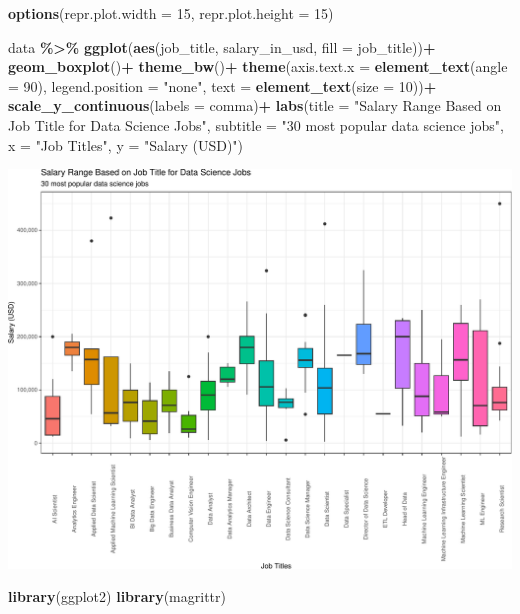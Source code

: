 \documentclass[
]{article}
\newenvironment{Shaded}{\begin{snugshade}}{\end{snugshade}}
\newcommand{\AttributeTok}[1]{\textcolor[rgb]{0.13,0.29,0.53}{#1}}
\newcommand{\DecValTok}[1]{\textcolor[rgb]{0.00,0.00,0.81}{#1}}
\newcommand{\FunctionTok}[1]{\textcolor[rgb]{0.13,0.29,0.53}{\textbf{#1}}}
\newcommand{\NormalTok}[1]{#1}
\newcommand{\SpecialCharTok}[1]{\textcolor[rgb]{0.81,0.36,0.00}{\textbf{#1}}}
\newcommand{\StringTok}[1]{\textcolor[rgb]{0.31,0.60,0.02}{#1}}
\begin{document}
\begin{Shaded}
\begin{Highlighting}[]
\FunctionTok{options}\NormalTok{(}\AttributeTok{repr.plot.width =} \DecValTok{15}\NormalTok{, }\AttributeTok{repr.plot.height =} \DecValTok{15}\NormalTok{)}

\NormalTok{data }\SpecialCharTok{\%\textgreater{}\%}
     \FunctionTok{ggplot}\NormalTok{(}\FunctionTok{aes}\NormalTok{(job\_title, salary\_in\_usd, }\AttributeTok{fill =}\NormalTok{ job\_title))}\SpecialCharTok{+}
     \FunctionTok{geom\_boxplot}\NormalTok{()}\SpecialCharTok{+}
     \FunctionTok{theme\_bw}\NormalTok{()}\SpecialCharTok{+}
     \FunctionTok{theme}\NormalTok{(}\AttributeTok{axis.text.x =} \FunctionTok{element\_text}\NormalTok{(}\AttributeTok{angle =} \DecValTok{90}\NormalTok{), }\AttributeTok{legend.position =} \StringTok{"none"}\NormalTok{, }\AttributeTok{text =} \FunctionTok{element\_text}\NormalTok{(}\AttributeTok{size =} \DecValTok{10}\NormalTok{))}\SpecialCharTok{+}
     \FunctionTok{scale\_y\_continuous}\NormalTok{(}\AttributeTok{labels =}\NormalTok{ comma)}\SpecialCharTok{+}
     \FunctionTok{labs}\NormalTok{(}\AttributeTok{title =} \StringTok{"Salary Range Based on Job Title for Data Science Jobs"}\NormalTok{, }\AttributeTok{subtitle =} \StringTok{"30 most popular data science jobs"}\NormalTok{, }\AttributeTok{x =} \StringTok{"Job Titles"}\NormalTok{, }\AttributeTok{y =} \StringTok{"Salary (USD)"}\NormalTok{)}
\end{Highlighting}
\end{Shaded}

\includegraphics{Susman_RProject_files/figure-latex/unnamed-chunk-19-1.pdf}

\begin{Shaded}
\begin{Highlighting}[]
\FunctionTok{library}\NormalTok{(ggplot2)}
\FunctionTok{library}\NormalTok{(magrittr)}
\end{Highlighting}
\end{Shaded}
\end{document}
